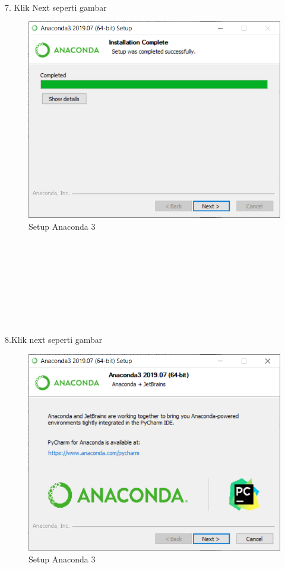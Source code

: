 \documentclass{article}
\begin{document}
\\
\\
\\
\\
\\
\\
\\
\\
7. Klik Next seperti gambar\\
\begin{figure}[h]
	\centering
		\includegraphics[scale=0.5]{Gambar/A7.PNG}
		\caption{Setup Anaconda 3}
\end{figure}
\\
\\
\\
\\
\\
\\
\\
\\
8.Klik next seperti gambar\\
\begin{figure}[h]
	\centering
		\includegraphics[scale=0.5]{Gambar/A8.PNG}
		\caption{Setup Anaconda 3}
\end{figure}
\end{document}
